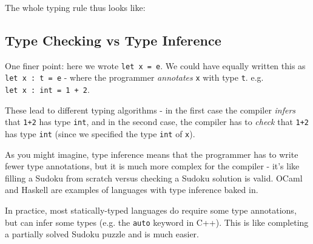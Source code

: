 {{The whole typing rule thus looks like:

{{}}

\hypertarget{type-checking-vs-type-inference}{%
\subsection{\texorpdfstring{\protect\hyperlink{type-checking-vs-type-inference}{}Type
Checking vs Type
Inference}{Type Checking vs Type Inference}}\label{type-checking-vs-type-inference}}

One finer point: here we wrote \texttt{let\ x\ =\ e}. We could have
equally written this as \texttt{let\ x\ :\ t\ =\ e} - where the
programmer \emph{annotates} \texttt{x} with type \texttt{t}. e.g.
\texttt{let\ x\ :\ int\ =\ 1\ +\ 2}.

These lead to different typing algorithms - in the first case the
compiler \emph{infers} that \texttt{1+2} has type \texttt{int}, and in
the second case, the compiler has to \emph{check} that \texttt{1+2} has
type \texttt{int} (since we specified the type \texttt{int} of
\texttt{x}).

As you might imagine, type inference means that the programmer has to
write fewer type annotations, but it is much more complex for the
compiler - it's like filling a Sudoku from scratch versus checking a
Sudoku solution is valid. OCaml and Haskell are examples of languages
with type inference baked in.

In practice, most statically-typed languages do require some type
annotations, but can infer some types (e.g. the \texttt{auto} keyword in
C++). This is like completing a partially solved Sudoku puzzle and is
much easier.

}}
